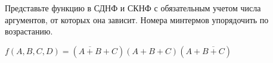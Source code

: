 \question Представьте функцию в СДНФ и СКНФ с обязательным учетом числа аргументов,
 от которых она зависит. Номера минтермов упорядочить по возрастанию.

$f(A,B,C,D) = (\overline{A+B}+C)(A+B+C)(A+\overline{B+C})$